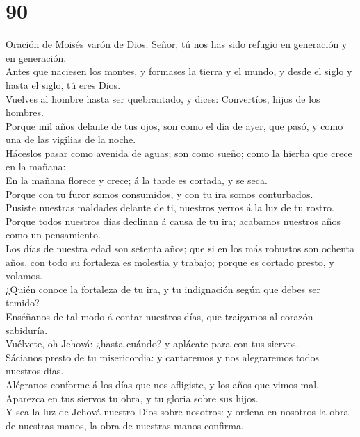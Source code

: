 \hypertarget{section-89}{%
\section{90}\label{section-89}}

 Oración de Moisés varón de Dios. Señor, tú nos has sido
refugio en generación y en generación.\\
 Antes que naciesen los montes, y formases la tierra y el
mundo, y desde el siglo y hasta el siglo, tú eres Dios.\\
 Vuelves al hombre hasta ser quebrantado, y dices:
Convertíos, hijos de los hombres.\\
 Porque mil años delante de tus ojos, son como el día de
ayer, que pasó, y como una de las vigilias de la noche.\\
 Háceslos pasar como avenida de aguas; son como sueño;
como la hierba que crece en la mañana:\\
 En la mañana florece y crece; á la tarde es cortada, y se
seca.\\
 Porque con tu furor somos consumidos, y con tu ira somos
conturbados.\\
 Pusiste nuestras maldades delante de ti, nuestros yerros
á la luz de tu rostro.\\
 Porque todos nuestros días declinan á causa de tu ira;
acabamos nuestros años como un pensamiento.\\
 Los días de nuestra edad son setenta años; que si en los
más robustos son ochenta años, con todo su fortaleza es molestia y
trabajo; porque es cortado presto, y volamos.\\
 ¿Quién conoce la fortaleza de tu ira, y tu indignación
según que debes ser temido?\\
 Enséñanos de tal modo á contar nuestros días, que
traigamos al corazón sabiduría.\\
 Vuélvete, oh Jehová: ¿hasta cuándo? y aplácate para con
tus siervos.\\
 Sácianos presto de tu misericordia: y cantaremos y nos
alegraremos todos nuestros días.\\
 Alégranos conforme á los días que nos afligiste, y los
años que vimos mal.\\
 Aparezca en tus siervos tu obra, y tu gloria sobre sus
hijos.\\
 Y sea la luz de Jehová nuestro Dios sobre nosotros: y
ordena en nosotros la obra de nuestras manos, la obra de nuestras manos
confirma.

